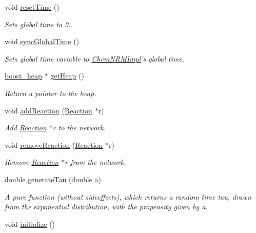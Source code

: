 \begin{DoxyCompactItemize}
void \hyperlink{classchem_1_1ChemNRMImpl_abc38c43b16a4ab1aa31505152e4426ed}{reset\-Time} ()
\begin{DoxyCompactList}\small\item\em Sets global time to 0.. \end{DoxyCompactList}\item 
void \hyperlink{classchem_1_1ChemNRMImpl_ad096a21196bb3e5a978dc3fdb50d8e1b}{sync\-Global\-Time} ()
\begin{DoxyCompactList}\small\item\em Sets global time variable to \hyperlink{classchem_1_1ChemNRMImpl}{Chem\-N\-R\-M\-Impl}'s global time. \end{DoxyCompactList}\item 
\hyperlink{namespacechem_aacd1d2bb93e0bb1b1af9bb1fbb5133ca}{boost\-\_\-heap} $\ast$ \hyperlink{classchem_1_1ChemNRMImpl_ae52572d35469dd8569457dbce96af78e}{get\-Heap} ()
\begin{DoxyCompactList}\small\item\em Return a pointer to the heap. \end{DoxyCompactList}\item 
void \hyperlink{classchem_1_1ChemNRMImpl_a1b325b27b22f443f99fce659ae78aeee}{add\-Reaction} (\hyperlink{classchem_1_1Reaction}{Reaction} $\ast$r)
\begin{DoxyCompactList}\small\item\em Add \hyperlink{classchem_1_1Reaction}{Reaction} $\ast$r to the network. \end{DoxyCompactList}\item 
void \hyperlink{classchem_1_1ChemNRMImpl_ad3a2b84f69c444a55b60d21200537338}{remove\-Reaction} (\hyperlink{classchem_1_1Reaction}{Reaction} $\ast$r)
\begin{DoxyCompactList}\small\item\em Remove \hyperlink{classchem_1_1Reaction}{Reaction} $\ast$r from the network. \end{DoxyCompactList}\item 
double \hyperlink{classchem_1_1ChemNRMImpl_a196f525d2e2392c0531f763fd8169701}{generate\-Tau} (double a)
\begin{DoxyCompactList}\small\item\em A pure function (without sideeffects), which returns a random time tau, drawn from the exponential distribution, with the propensity given by a. \end{DoxyCompactList}\item 
void \hyperlink{classchem_1_1ChemNRMImpl_a685ac34bfa4b8226045bd3b8c6cdec95}{initialize} ()

\end{DoxyCompactItemize}

